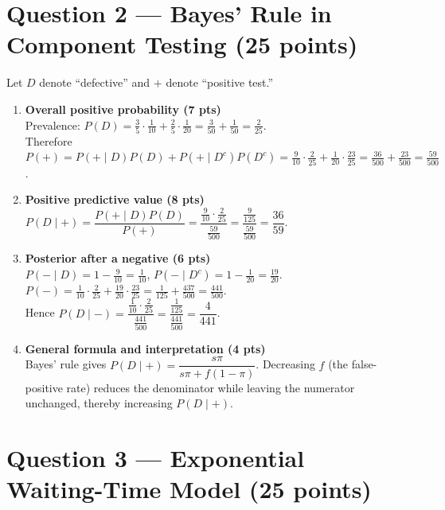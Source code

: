 \documentclass[11pt]{article}
\begin{document}
\section*{Question 2 — Bayes' Rule in Component Testing (25 points)}

Let $D$ denote ``defective'' and $+$ denote ``positive test.''

\begin{enumerate}
  \item \textbf{Overall positive probability (7 pts)}\\
  Prevalence: $P(D) = \tfrac{3}{5}\cdot\tfrac{1}{10} + \tfrac{2}{5}\cdot\tfrac{1}{20} = \tfrac{3}{50} + \tfrac{1}{50} = \tfrac{2}{25}$.\\
  Therefore $P(+) = P(+\mid D)P(D) + P(+\mid D^c)P(D^c) = \tfrac{9}{10}\cdot\tfrac{2}{25} + \tfrac{1}{20}\cdot\tfrac{23}{25} = \tfrac{36}{500} + \tfrac{23}{500} = \tfrac{59}{500}$.

  \item \textbf{Positive predictive value (8 pts)}\\
  $P(D\mid +) = \dfrac{P(+\mid D)P(D)}{P(+)} = \dfrac{\tfrac{9}{10}\cdot\tfrac{2}{25}}{\tfrac{59}{500}} = \dfrac{\tfrac{9}{125}}{\tfrac{59}{500}} = \dfrac{36}{59}$.

  \item \textbf{Posterior after a negative (6 pts)}\\
  $P(-\mid D) = 1 - \tfrac{9}{10} = \tfrac{1}{10}$, \; $P(-\mid D^c) = 1 - \tfrac{1}{20} = \tfrac{19}{20}$.\\
  $P(-) = \tfrac{1}{10}\cdot\tfrac{2}{25} + \tfrac{19}{20}\cdot\tfrac{23}{25} = \tfrac{1}{125} + \tfrac{437}{500} = \tfrac{441}{500}$.\\
  Hence $P(D\mid -) = \dfrac{\tfrac{1}{10}\cdot\tfrac{2}{25}}{\tfrac{441}{500}} = \dfrac{\tfrac{1}{125}}{\tfrac{441}{500}} = \dfrac{4}{441}$.

  \item \textbf{General formula and interpretation (4 pts)}\\
  Bayes' rule gives $P(D\mid +) = \dfrac{s\pi}{s\pi + f(1-\pi)}$. Decreasing $f$ (the false-positive rate) reduces the denominator while leaving the numerator unchanged, thereby increasing $P(D\mid +)$.
\end{enumerate}

\section*{Question 3 — Exponential Waiting-Time Model (25 points)}
\end{document}
